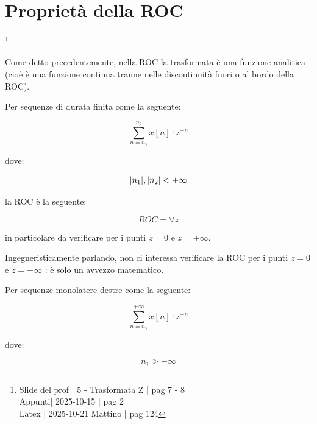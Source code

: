 \newpage 

\section{Proprietà della ROC} \label{sec: Proprietà della ROC}

\footnote{ 
    Slide del prof | 5 - Trasformata Z | pag 7  - 8\\
    Appunti| 2025-10-15 | pag 2 \\ 
    Latex | 2025-10-21 Mattino | pag 124
} 

Come detto precedentemente, nella ROC la trasformata è una funzione analitica (cioè è una funzione continua tranne nelle discontinuità fuori o al bordo della ROC). \newline 

Per sequenze di durata finita come la seguente: 

{
    \Large 
    \begin{equation}
        \sum_{n = n_1}^{n_2}
        x \left[ n\right] \cdot z^{-n}
    \end{equation}
}

dove: 

{
    \Large 
    \begin{equation}
        \abs{n_1}, \abs{n_2} < + \infty
    \end{equation}
}

la ROC è la seguente: 

{
    \Large 
    \begin{equation}
        ROC = \forall z 
    \end{equation}
}

in particolare da verificare per i punti $z = 0$ e $z = +\infty$. \newline 

\begin{tcolorbox}
    Ingegneristicamente parlando, non ci interessa verificare la ROC per i punti $z = 0$ e $z = +\infty$ : è solo un avvezzo matematico. 
\end{tcolorbox}

Per sequenze monolatere destre come la seguente:

{
    \Large 
    \begin{equation}
        \sum_{n = n_1}^{+ \infty}
        x \left[ n\right] \cdot z^{-n}
    \end{equation}
}

dove: 

{
    \Large 
    \begin{equation}
        n_1 > - \infty
    \end{equation}
}

